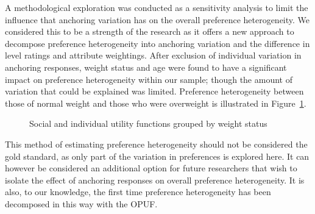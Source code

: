 \documentclass[
  letterpaper,
  DIV=11,
  numbers=noendperiod]{scrartcl}
\begin{document}
A methodological exploration was conducted as a sensitivity analysis to
limit the influence that anchoring variation has on the overall
preference heterogeneity. We considered this to be a strength of the
research as it offers a new approach to decompose preference
heterogeneity into anchoring variation and the difference in level
ratings and attribute weightings. After exclusion of individual
variation in anchoring responses, weight status and age were found to
have a significant impact on preference heterogeneity within our sample;
though the amount of variation that could be explained was limited.
Preference heterogeneity between those of normal weight and those who
were overweight is illustrated in Figure~\ref{fig-weight}.

\begin{figure}


\caption{\label{fig-weight}Social and individual utility functions
grouped by weight status}

\end{figure}%

This method of estimating preference heterogeneity should not be
considered the gold standard, as only part of the variation in
preferences is explored here. It can however be considered an additional
option for future researchers that wish to isolate the effect of
anchoring responses on overall preference heterogeneity. It is also, to
our knowledge, the first time preference heterogeneity has been
decomposed in this way with the OPUF.
\end{document}
